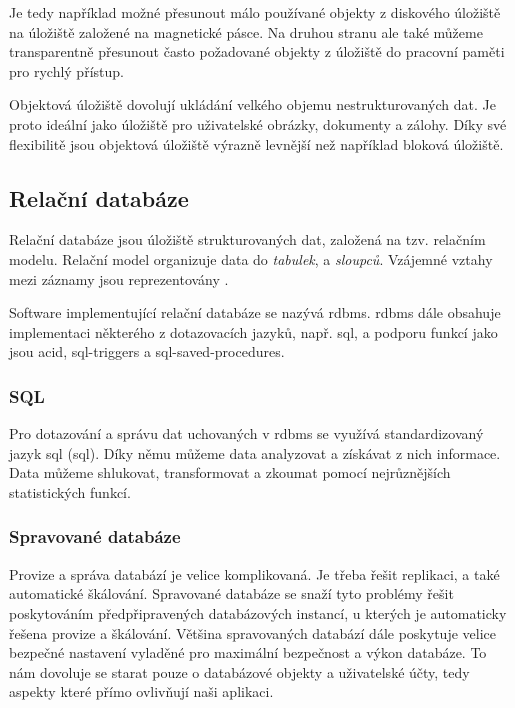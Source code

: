 Je tedy například možné přesunout málo používané objekty z diskového úložiště na úložiště založené na magnetické pásce. Na druhou stranu ale také můžeme transparentně přesunout často požadované objekty z úložiště do pracovní paměti pro rychlý přístup.

Objektová úložiště dovolují ukládání velkého objemu nestrukturovaných dat. Je proto ideální jako úložiště pro uživatelské obrázky, dokumenty a zálohy. Díky své flexibilitě jsou objektová úložiště výrazně levnější než například bloková úložiště.

\subsection{Relační databáze}

Relační databáze\cite{relational-database} jsou úložiště strukturovaných dat, založená na tzv. relačním modelu. Relační model organizuje data do \emph{tabulek},  a \emph{sloupců}. Vzájemné vztahy mezi záznamy jsou reprezentovány . 

Software implementující relační databáze se nazývá \acrfull{rdbms}. \acrshort{rdbms} dále obsahuje implementaci některého z dotazovacích jazyků, např. \acrshort{sql}, a podporu funkcí jako jsou \acrshort{acid}, \glspl{sql-trigger} a \glspl{sql-saved-procedure}.

\subsubsection{SQL}

Pro dotazování a správu dat uchovaných v \acrshort{rdbms} se využívá standardizovaný jazyk \acrshort{sql} (\acrlong{sql})\cite{sql}. Díky němu můžeme data analyzovat a získávat z nich informace. Data můžeme shlukovat, transformovat a zkoumat pomocí nejrůznějších statistických funkcí.

\subsubsection{Spravované databáze}
\label{subsub:managed-databases}

Provize a správa databází je velice komplikovaná. Je třeba řešit replikaci, a také automatické škálování. Spravované databáze\cite{managed-databases} se snaží tyto problémy řešit poskytováním předpřipravených databázových instancí, u kterých je automaticky řešena provize a škálování. Většina spravovaných databází dále poskytuje velice bezpečné nastavení vyladěné pro maximální bezpečnost a výkon databáze. To nám dovoluje se starat pouze o databázové objekty a uživatelské účty, tedy aspekty které přímo ovlivňují naši aplikaci.

